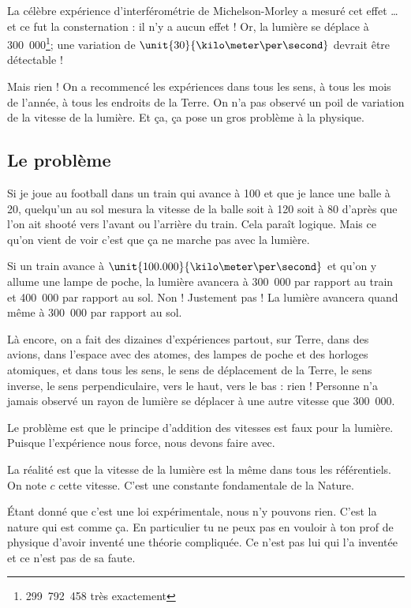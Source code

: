 La célèbre expérience d'interférométrie de Michelson-Morley\cite{BIBooJSDSooIUhMQQ} a mesuré cet effet \ldots et ce fut la consternation : il n'y a aucun effet ! Or, la lumière se déplace à \unit{300.000}{\kilo\meter\per\second}\footnote{\unit{299.792.458}{\meter\per\second} très exactement}; une variation de \( \unit{30}{\kilo\meter\per\second}\) devrait être détectable !

Mais rien ! On a recommencé les expériences dans tous les sens, à tous les mois de l'année, à tous les endroits de la Terre. On n'a pas observé un poil de variation de la vitesse de la lumière. Et ça, ça pose un gros problème à la physique.


\subsection{Le problème}

Si je joue au football dans un train qui avance à \unit{100}{\kilo\meter\per\hour} et que je lance une balle à \unit{20}{\kilo\meter\per\hour}, quelqu'un au sol mesura la vitesse de la balle soit à \unit{120}{\kilo\meter\per\hour} soit à \unit{80}{\kilo\meter\per\hour} d'après que l'on ait shooté vers l'avant ou l'arrière du train. Cela paraît logique. Mais ce qu'on vient de voir c'est que ça ne marche pas avec la lumière.

Si un train avance à \( \unit{100.000}{\kilo\meter\per\second}\) et qu'on y allume une lampe de poche, la lumière avancera à \unit{300.000}{\kilo\meter\per\second} par rapport au train et \unit{400.000}{\kilo\meter\per\second} par rapport au sol. Non ! Justement pas ! La lumière avancera quand même à \unit{300.000}{\kilo\meter\per\second} par rapport au sol.

Là encore, on a fait des dizaines d'expériences partout, sur Terre, dans des avions, dans l'espace avec des atomes, des lampes de poche et des horloges atomiques, et dans tous les sens, le sens de déplacement de la Terre, le sens inverse, le sens perpendiculaire, vers le haut, vers le bas : rien ! Personne n'a jamais observé un rayon de lumière se déplacer à une autre vitesse que \unit{300.000}{\kilo\meter\per\second}.

Le problème est que le principe d'addition des vitesses est faux pour la lumière. Puisque l'expérience nous force, nous devons faire avec.

\begin{loiphyz}		\label{LoiVitLum}
	La réalité est que la vitesse de la lumière est la même dans tous les référentiels. On note \( c\) cette vitesse. C'est une constante fondamentale de la Nature.
\end{loiphyz}
Étant donné que c'est une loi expérimentale, nous n'y pouvons rien. C'est la nature qui est comme ça. En particulier tu ne peux pas en vouloir à ton prof de physique d'avoir inventé une théorie compliquée. Ce n'est pas lui qui l'a inventée et ce n'est pas de sa faute.


